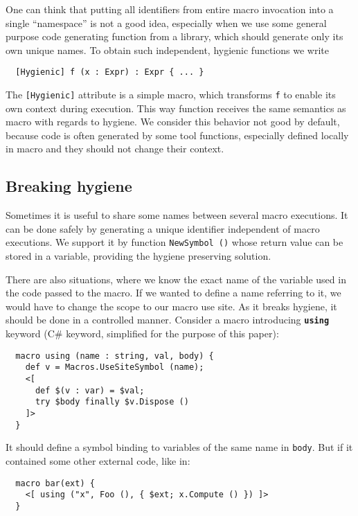 \documentclass{llncs}
\newcommand{\kw}[1]{{\tt \bf #1}}
\begin{document}
One can think that putting all identifiers from entire macro invocation into
a single ``namespace'' is not a good idea, especially when we use some general 
purpose code generating function from a library, which should generate only its 
own unique names. To obtain such independent, hygienic functions we write

\begin{verbatim}
  [Hygienic] f (x : Expr) : Expr { ... }
\end{verbatim}

The \verb,[Hygienic], attribute is a simple macro, which transforms \verb,f, 
to enable its own context during execution. This way function receives the
same semantics as macro with regards to hygiene. We consider this behavior
not good by default, because code is often generated by some tool functions,
especially defined locally in macro and they should not change their context.

\subsection{Breaking hygiene}
Sometimes it is useful to share some names between several macro executions.
It can be done safely by generating a unique identifier independent of macro
executions. We support it by function \verb,NewSymbol (), whose return value
can be stored in a variable, providing the hygiene preserving solution.

There are also situations, where we know the exact name of the variable used in 
the code passed to the macro. If we wanted to define a name referring to it, we 
would have to change the scope to our macro use site. As it breaks hygiene, 
it should be done in a controlled manner. Consider a macro introducing \kw{using} 
keyword (C\# keyword, simplified for the purpose of this paper):

\newpage
\begin{verbatim}
  macro using (name : string, val, body) {
    def v = Macros.UseSiteSymbol (name);
    <[ 
      def $(v : var) = $val;
      try $body finally $v.Dispose ()
    ]>
  }
\end{verbatim}

It should define a symbol binding to variables of the same name in \verb,body,.
But if it contained some other external code, like in:

\begin{verbatim}
  macro bar(ext) { 
    <[ using ("x", Foo (), { $ext; x.Compute () }) ]> 
  }
\end{verbatim} %
\end{document}
